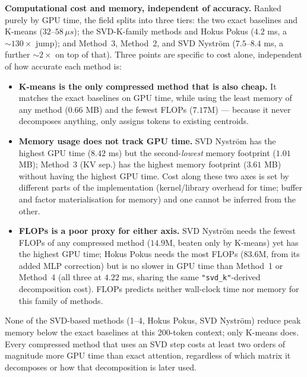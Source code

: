 \noindent \textbf{Computational cost and memory, independent of accuracy.} Ranked purely by
GPU time, the field splits into three tiers: the two exact baselines and K-means ($32$--$58\,\mu
s$); the SVD-K-family methods and Hokus Pokus ($4.2$ ms, a $\sim\!130\times$ jump); and
Method~3, Method~2, and SVD Nyström ($7.5$--$8.4$ ms, a further $\sim\!2\times$ on top of that).
Three points are specific to cost alone, independent of how accurate each method is:
\begin{itemize}
  \item \textbf{K-means is the only compressed method that is also cheap.} It matches the exact
    baselines on GPU time, while using the least memory of any method ($0.66$ MB)
    and the fewest FLOPs ($7.17$M) --- because it never decomposes anything, only assigns tokens
    to existing centroids.
  \item \textbf{Memory usage does not track GPU time.} SVD Nyström has the highest GPU
    time ($8.42$ ms) but the second-\emph{lowest} memory footprint ($1.01$ MB); Method~3 (KV
    sep.) has the highest memory footprint ($3.61$ MB) without having the highest GPU time. Cost
    along these two axes is set by different parts of the implementation (kernel/library
    overhead for time; buffer and factor materialisation for memory) and one cannot be inferred
    from the other.
  \item \textbf{FLOPs is a poor proxy for either axis.} SVD Nyström needs the fewest FLOPs of
    any compressed method ($14.9$M, beaten only by K-means) yet has the highest GPU time;
    Hokus Pokus needs the most FLOPs ($83.6$M, from its added MLP correction) but is no slower
    in GPU time than Method~1 or Method~4 (all three at $4.22$ ms, sharing the same
    \texttt{"svd\_k"}-derived decomposition cost). FLOPs predicts neither wall-clock time nor
    memory for this family of methods.
\end{itemize}
None of the SVD-based methods (1--4, Hokus Pokus, SVD Nyström) reduce peak memory below the
exact baselines at this 200-token context; only K-means does. Every compressed method that
uses an SVD step costs at least two orders of magnitude more GPU time than exact attention,
regardless of which matrix it decomposes or how that decomposition is later used.
